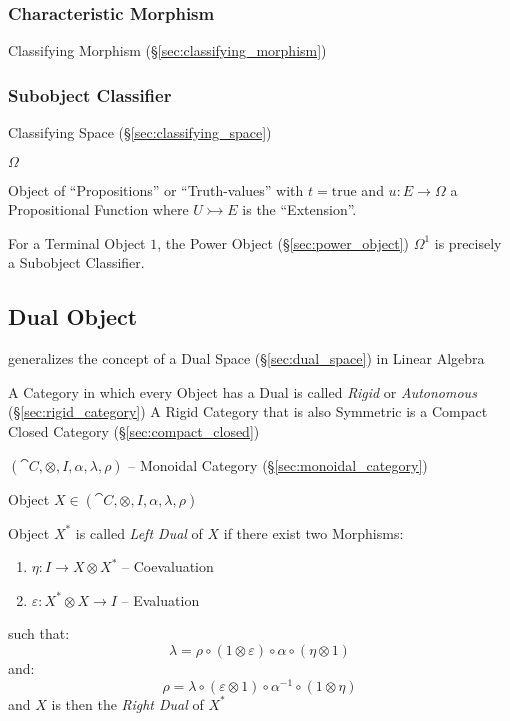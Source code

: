 \subsubsection{Characteristic Morphism}
\label{sec:characteristic_morphism}

Classifying Morphism (\S\ref{sec:classifying_morphism})



\subsubsection{Subobject Classifier}\label{sec:subobject_classifier}

Classifying Space (\S\ref{sec:classifying_space})

$\Omega$

Object of ``Propositions'' or ``Truth-values'' with $t =
\mathrm{true}$ and $u : E \rightarrow \Omega$ a Propositional Function
where $U \rightarrowtail E$ is the ``Extension''.

For a Terminal Object $1$, the Power Object (\S\ref{sec:power_object})
$\Omega^1$ is precisely a Subobject Classifier.



\subsection{Dual Object}\label{sec:dual_object}

generalizes the concept of a Dual Space (\S\ref{sec:dual_space}) in
Linear Algebra

A Category in which every Object has a Dual is called \emph{Rigid} or
\emph{Autonomous} (\S\ref{sec:rigid_category}) A Rigid Category that
is also Symmetric is a Compact Closed Category
(\S\ref{sec:compact_closed})

$(\cat{C}, \otimes, I, \alpha, \lambda, \rho)$ -- Monoidal Category
(\S\ref{sec:monoidal_category})

Object $X \in (\cat{C}, \otimes, I, \alpha, \lambda, \rho)$

Object $X^*$ is called \emph{Left Dual} of $X$ if there exist two
Morphisms:
\begin{enumerate}
  \item $\eta : I \rightarrow X \otimes X^*$ -- Coevaluation
  \item $\varepsilon : X^* \otimes X \rightarrow I$ -- Evaluation
\end{enumerate}
such that:
\[
  \lambda = \rho \circ (1 \otimes \varepsilon) \circ \alpha \circ
    (\eta \otimes 1)
\]
and:
\[
  \rho = \lambda \circ (\varepsilon \otimes 1) \circ \alpha^{-1}
    \circ (1 \otimes \eta)
\]
and $X$ is then the \emph{Right Dual} of $X^*$


